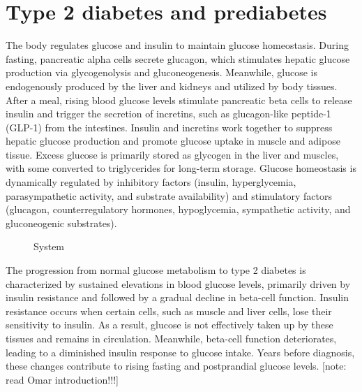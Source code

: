 \documentclass[
  a4paper,
  headsepline=true,
  open=any]{scrbook}
\begin{document}

\hypertarget{type-2-diabetes-and-prediabetes}{%
\chapter{Type 2 diabetes and
prediabetes}\label{type-2-diabetes-and-prediabetes}}

The body regulates glucose and insulin to maintain glucose homeostasis.
During fasting, pancreatic alpha cells secrete glucagon, which
stimulates hepatic glucose production via glycogenolysis and
gluconeogenesis. Meanwhile, glucose is endogenously produced by the
liver and kidneys and utilized by body tissues. After a meal, rising
blood glucose levels stimulate pancreatic beta cells to release insulin
and trigger the secretion of incretins, such as glucagon-like peptide-1
(GLP-1) from the intestines. Insulin and incretins work together to
suppress hepatic glucose production and promote glucose uptake in muscle
and adipose tissue. Excess glucose is primarily stored as glycogen in
the liver and muscles, with some converted to triglycerides for
long-term storage. Glucose homeostasis is dynamically regulated by
inhibitory factors (insulin, hyperglycemia, parasympathetic activity,
and substrate availability) and stimulatory factors (glucagon,
counterregulatory hormones, hypoglycemia, sympathetic activity, and
gluconeogenic substrates).

\begin{figure}

\begin{minipage}[t]{\linewidth}

{\centering 


\caption{System}

}

\end{minipage}%

\end{figure}

The progression from normal glucose metabolism to type 2 diabetes is
characterized by sustained elevations in blood glucose levels, primarily
driven by insulin resistance and followed by a gradual decline in
beta-cell function. Insulin resistance occurs when certain cells, such
as muscle and liver cells, lose their sensitivity to insulin. As a
result, glucose is not effectively taken up by these tissues and remains
in circulation. Meanwhile, beta-cell function deteriorates, leading to a
diminished insulin response to glucose intake. Years before diagnosis,
these changes contribute to rising fasting and postprandial glucose
levels. {[}note: read Omar introduction!!!{]}
\end{document}
